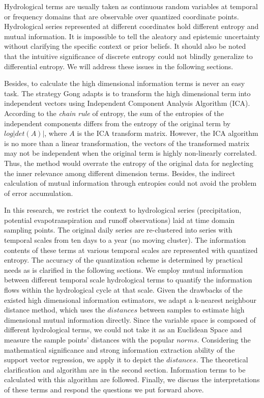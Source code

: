 \documentclass[11pt]{article}
\begin{document}
Hydrological terms are usually taken as continuous random variables at temporal or frequency domains that are observable over quantized coordinate points. Hydrological series represented at different coordinates hold different entropy and mutual information. It is impossible to tell the aleatory and epistemic uncertainty without clarifying the specific context or prior beliefs\cite{weijs2013data}. It should also be noted that the intuitive significance of discrete entropy could not blindly generalize to differential entropy. We will address these issues in the following sections. 

Besides, to calculate the high dimensional information terms is never an easy task. The strategy Gong adapts is to transform the high dimensional term into independent vectors using Independent Component Analysis  Algorithm (ICA)\cite{hyvarinen2004independent}. According to the \emph{chain rule} of entropy, the sum of the entropies of the independent components differs from the entropy of the original term by $log|det(A)|$, where $A$ is the ICA transform matrix. However, the ICA algorithm is no more than a linear transformation, the vectors of the transformed matrix may   not be independent when the original term is highly non-linearly correlated. Thus, the method would overrate the entropy of the original data for neglecting the inner relevance among different dimension terms. Besides, the indirect calculation of mutual information through entropies could not avoid the problem of  error accumulation.


In this research, we restrict the context to hydrological series (precipitation, potential evapotranspiration and runoff observations) laid at time domain sampling points. The original daily series are re-clustered into series with temporal scales from ten days to a year (no moving cluster). The information contents of these terms at various temporal scales are represented with quantized entropy. The accuracy of the quantization scheme is determined by practical needs as is clarified in the following sections. We employ mutual information between different temporal scale hydrological terms to quantify the information flows within the hydrological cycle at that scale. Given the drawbacks of the existed high dimensional information estimators, we adapt a k-nearest neighbour distance method\cite{kraskov2004estimating}, which uses the $distances$ between samples to estimate high dimensional mutual information directly. Since the variable space is composed of different hydrological terms, we could not take it as an Euclidean Space and measure the sample points' distances with the popular $norms$. Considering the mathematical significance and strong information extraction ability of the support vector regression\cite{cortes1995support}, we apply it to depict the $distances$. The theoretical clarification and algorithm are in the second section. Information terms to be calculated with this algorithm are followed. Finally, we discuss the interpretations of these terms and respond the questions we put forward above.
\end{document}
